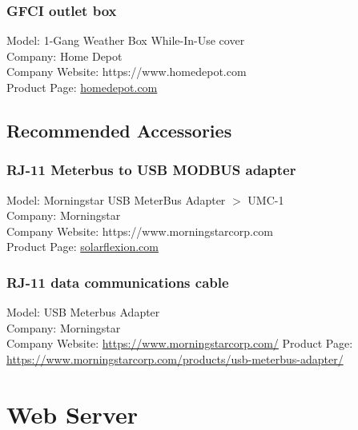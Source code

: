 \subsubsection{GFCI outlet box}
Model: 1-Gang Weather Box While-In-Use cover \\
Company: Home Depot\\
Company Website: https://www.homedepot.com \\
Product Page: \href{https://www.homedepot.com/p/1-Gang-Weather-Box-While-In-Use-Cover-WIU-1/206469236?cm_mmc=Shopping%7CG%7CVF%7CD27E%7C27-6_CONDUIT-BOXES-FITTINGS%7CNA%7CPLA%7c71700000033099037%7c58700003867178937%7c92700031086148565&gclid=EAIaIQobChMI2PLwrenQ4wIVAf_jBx2q5Q92EAkYASABEgKGrPD_BwE&gclsrc=aw.ds}{homedepot.com} \\

\subsection{Recommended Accessories}

\subsubsection{RJ-11 Meterbus to USB MODBUS adapter}
Model: Morningstar USB MeterBus Adapter $>$ UMC-1 \\
Company: Morningstar \\
Company Website: https://www.morningstarcorp.com \\
Product Page: \href{https://solarflexion.com/umc-1?_vsrefdom=adwords&gclid=EAIaIQobChMIs6q9_eTQ4wIVef_jBx3u-AdIEAQYBSABEgKaCPD_BwE}{solarflexion.com} \\


\subsubsection{RJ-11 data communications cable}
Model: USB Meterbus Adapter \\
Company: Morningstar \\ 
Company Website: \href{https://www.morningstarcorp.com/}{https://www.morningstarcorp.com/}
Product Page: \href{https://www.morningstarcorp.com/products/usb-meterbus-adapter/}{https://www.morningstarcorp.com/products/usb-meterbus-adapter/}
 
\section{Web Server}

